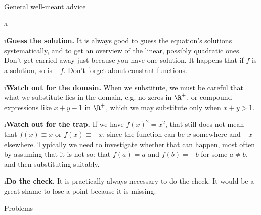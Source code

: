 \enditems

\sec General well-meant advice

\begitems \style a

\i \textbf{Guess the solution.} It is always good to guess the equation's solutions systematically, and to get an overview of the linear,
possibly quadratic ones. Don't get carried away just because you have one
solution. It happens that if $f$ is a solution, so is $-f$. Don't forget about
constant functions.

\i \textbf{Watch out for the domain.} When we substitute, we must be careful that what we substitute lies in the domain, e.g. no zeros in $\R^+$, or compound expressions like $x+y-1$ in $\R^+$, which we may substitute only when $x+y>1$.

\i \textbf{Watch out for the trap.} If we have $f(x)^2=x^2$, that still does not mean that $f(x)\equiv x$ or $f(x)\equiv-x$, since the function can be $x$ somewhere and $-x$ elsewhere. Typically we need to investigate whether that can happen, most often by assuming that it is not so: that $f(a)=a$ and $f(b)=-b$ for some $a\neq b$, and then substituting suitably.

\i \textbf{Do the check.} It is practically always necessary to do the check. It would be a great shame to lose a point
because it is missing.

\enditems

\sec Problems



